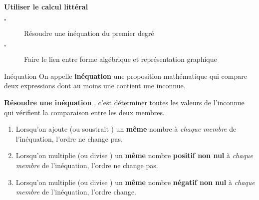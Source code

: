 \begin{titre}

\end{titre}


\begin{CpsCol}
\textbf{Utiliser le calcul littéral}
\begin{description}
\item[$\square$] Résoudre une inéquation du premier degré
\item[$\square$] Faire le lien entre forme algébrique et représentation graphique
\end{description}
\end{CpsCol}




\begin{DefT}{Inéquation}
On appelle \textbf{inéquation} une proposition mathématique qui compare deux expressions dont au moins une contient une inconnue. 

\textbf{Résoudre une inéquation} , c'est déterminer toutes les valeurs de l'inconnue qui vérifient la comparaison entre les deux membres.
\end{DefT}

\begin{Reg}
\begin{enumerate}
\item Lorsqu'on ajoute (ou soustrait ) un \textbf{même} nombre à \textit{chaque membre} de l'inéquation, l'ordre ne change pas.
\item Lorsqu'on multiplie (ou divise ) un \textbf{même} nombre \textbf{positif non nul} à \textit{chaque membre} de l'inéquation, l'ordre ne change pas.
\item {} Lorsqu'on multiplie (ou divise ) un \textbf{même} nombre \textbf{négatif non nul} à \textit{chaque membre} de l'inéquation, l'ordre change.
\end{enumerate}
\end{Reg}



